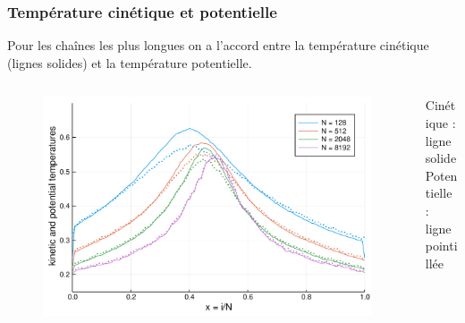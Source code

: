 \begin{frame}

    \frametitle{Température cinétique et potentielle}

    Pour les chaînes les plus longues on a l'accord entre la
    température cinétique (lignes solides) et la température
    potentielle.

    \begin{columns}

        \begin{column}{0.8\textwidth}
            \begin{figure}
                \includegraphics[scale=0.4]{plots/temperature_scaled.pdf}
            \end{figure}
        \end{column}

        \begin{column}{0.2\textwidth}
            \scriptsize
            Cinétique : \\
            ligne solide \\
            \vspace{3mm}
            Potentielle : \\
            ligne pointillée

        \end{column}

    \end{columns}

\end{frame}

